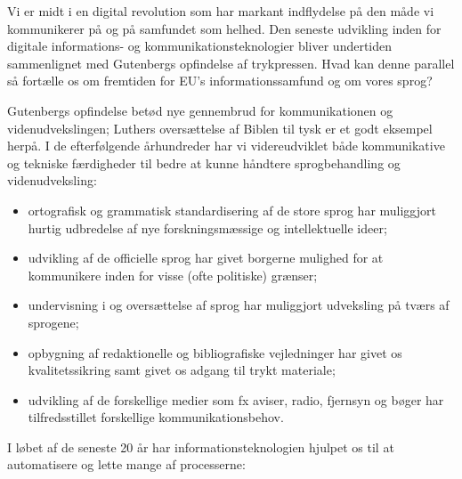 \begin{multicols}{2}

Vi er midt i en digital revolution som har markant indflydelse \mbox{p\aa} den m\aa de vi kommunikerer \mbox{p\aa} og \mbox{p\aa} samfundet som helhed. Den seneste udvikling inden for digitale informations- og kommunikationsteknologier bliver undertiden sammenlignet med Gutenbergs opfindelse af trykpressen. Hvad kan denne parallel \mbox{s\aa} fort\ae lle os om fremtiden for EU's informationssamfund og om vores sprog?


Gutenbergs opfindelse bet\o d nye gennembrud for kommunikationen og videnudvekslingen; Luthers overs\ae ttelse af Biblen til tysk er et godt eksempel \mbox{herp\aa}. I de efterf\o lgende \aa rhundreder har vi videreudviklet b\aa de kommunikative og tekniske f\ae rdigheder til bedre at kunne h\aa ndtere sprogbehandling og videnudveksling: 

 \begin{itemize}
      \item ortografisk og grammatisk standardisering af de store sprog har muliggjort hurtig udbredelse af nye forskningsm\ae ssige og intellektuelle ideer;
      \item udvikling af de officielle sprog har givet borgerne mulighed for at kommunikere inden for visse (ofte politiske) gr\ae nser;
      \item undervisning i og overs\ae ttelse af sprog har muliggjort udveksling \mbox{p\aa} tv\ae rs af sprogene;
\item opbygning af redaktionelle og bibliografiske vejledninger har givet os kvalitetssikring samt givet os adgang til trykt materiale;
      \item udvikling af de forskellige medier som fx aviser, radio, fjernsyn og b\o ger har tilfredsstillet forskellige kommunikationsbehov.
    \end{itemize}

 I l\o bet af de seneste 20 \aa r har informationsteknologien hjulpet os til at automatisere og lette mange af processerne:


\end{multicols}
